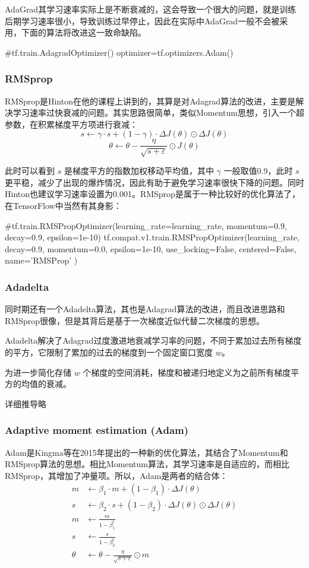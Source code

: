 \documentclass[12pt]{article}
\begin{document}
AdaGrad其学习速率实际上是不断衰减的，这会导致一个很大的问题，就是训练后期学习速率很小，导致训练过早停止，因此在实际中AdaGrad一般不会被采用，下面的算法将改进这一致命缺陷。
\begin{python}
#tf.train.AdagradOptimizer()
optimizer=tf.optimizers.Adam()
\end{python}

\subsubsection{RMSprop}
RMSprop是Hinton在他的课程上讲到的，其算是对Adagrad算法的改进，主要是解决学习速率过快衰减的问题。其实思路很简单，类似Momentum思想，引入一个超参数，在积累梯度平方项进行衰减：
$$
s \leftarrow \gamma \cdot s + (1-\gamma) \cdot \Delta J(\theta) \odot \Delta J(\theta)
$$
$$
\theta \leftarrow \theta - \frac{\eta}{\sqrt{s + \varepsilon}} \odot J(\theta)
$$

此时可以看到 $s$ 是梯度平方的指数加权移动平均值，其中 $\gamma$ 一般取值0.9，此时 $s$ 更平稳，减少了出现的爆炸情况，因此有助于避免学习速率很快下降的问题。同时Hinton也建议学习速率设置为0.001。RMSprop是属于一种比较好的优化算法了，在TensorFlow中当然有其身影：
\begin{python}
#tf.train.RMSPropOptimizer(learning_rate=learning_rate, momentum=0.9, decay=0.9, epsilon=1e-10)
tf.compat.v1.train.RMSPropOptimizer(learning_rate, decay=0.9, momentum=0.0, epsilon=1e-10, use_locking=False, centered=False, name='RMSProp'
)
\end{python}

\subsubsection{Adadelta}
同时期还有一个Adadelta算法，其也是Adagrad算法的改进，而且改进思路和RMSprop很像，但是其背后是基于一次梯度近似代替二次梯度的思想。

Adadelta解决了Adagrad过度激进地衰减学习率的问题，不同于累加过去所有梯度的平方，它限制了累加的过去的梯度到一个固定窗口宽度 $w$。

为进一步简化存储 $w$ 个梯度的空间消耗，梯度和被递归地定义为之前所有梯度平方的均值的衰减。

详细推导略

\subsubsection{Adaptive moment estimation (Adam)}
Adam是Kingma等在2015年提出的一种新的优化算法，其结合了Momentum和RMSprop算法的思想。相比Momentum算法，其学习速率是自适应的，而相比RMSprop，其增加了冲量项。所以，Adam是两者的结合体：
\begin{align*}
m &\leftarrow \beta_1 \cdot m + (1-\beta_1)\cdot \Delta J(\theta) \\
s &\leftarrow \beta_2 \cdot s + (1-\beta_2) \cdot \Delta J(\theta) \odot \Delta J(\theta) \\
m &\leftarrow \frac{m}{1-\beta_1^t} \\
s &\leftarrow \frac{s}{1-\beta_2^t} \\
\theta &\leftarrow \theta - \frac{\eta}{\sqrt{s+\varepsilon}}\odot m
\end{align*}
\end{document}

